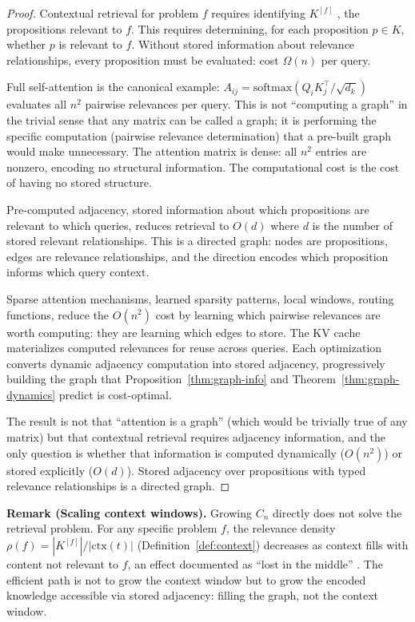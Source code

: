 \documentclass[11pt]{article}
\theoremstyle{definition}
\begin{document}
\begin{proof}
Contextual retrieval for problem $f$ requires identifying $K^{[f]}$
, the propositions relevant to $f$. This requires determining, for
each proposition $p \in K$, whether $p$ is relevant to $f$. Without
stored information about relevance relationships, every proposition must
be evaluated: cost $\Omega(n)$ per query.

Full self-attention is the canonical example:
$A_{ij} = \mathrm{softmax}(Q_i K_j^\top / \sqrt{d_k})$ evaluates all
$n^2$ pairwise relevances per query. This is not ``computing a graph''
in the trivial sense that any matrix can be called a graph; it is
performing the specific computation (pairwise relevance determination)
that a pre-built graph would make unnecessary. The attention matrix is
dense: all $n^2$ entries are nonzero, encoding no structural
information. The computational cost is the cost of having no stored
structure.

Pre-computed adjacency, stored information about which propositions
are relevant to which queries, reduces retrieval to $O(d)$ where $d$
is the number of stored relevant relationships. This is a directed
graph: nodes are propositions, edges are relevance relationships, and
the direction encodes which proposition informs which query context.

Sparse attention mechanisms, learned sparsity patterns, local
windows, routing functions, reduce the $O(n^2)$ cost by learning
which pairwise relevances are worth computing: they are learning which
edges to store. The KV cache materializes computed relevances for reuse
across queries. Each optimization converts dynamic adjacency computation
into stored adjacency, progressively building the graph that
Proposition~\ref{thm:graph-info} and Theorem~\ref{thm:graph-dynamics} predict
is cost-optimal.

The result is not that ``attention is a graph'' (which would be
trivially true of any matrix) but that contextual retrieval requires
adjacency information, and the only question is whether that information
is computed dynamically ($O(n^2)$) or stored explicitly ($O(d)$). Stored
adjacency over propositions with typed relevance relationships is a
directed graph.
\end{proof}

\textbf{Remark (Scaling context windows).}
Growing $C_n$ directly does not solve the retrieval problem. For any
specific problem $f$, the relevance density $\rho(f) = |K^{[f]}| /
|\mathrm{ctx}(t)|$ (Definition~\ref{def:context}) decreases as context
fills with content not relevant to $f$, an effect documented
as ``lost in the middle'' \cite{Liu2024}. The efficient
path is not to grow the context window but to grow the encoded knowledge
accessible via stored adjacency: filling the graph, not the context
window.
\end{document}
